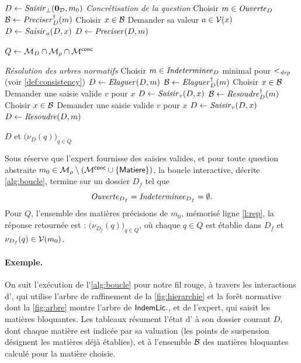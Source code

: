 \documentclass[review]{jflart}
\begin{document}
\begin{algorithm}[ht]
  \caption{Boucle interactive de résolution d'une question}
  \label{alg:boucle}
\begin{algorithmic}[1]
\small
\State $D \gets \mathit{Saisir}_\bot(\mathbf{0}_{\mathcal{D}},m_0)$
\Statex \textit{Concrétisation de la question}
  \State Choisir $m\in\mathit{Ouverte}_{D}$
  \State $\mathcal{B} \gets \mathit{Preciser}^\dagger_{D}(m)$
    \State Choisir $x\in \mathcal{B}$
    \State Demander sa valeur $a\in\mathcal{V}(x)$
    \State $D \gets \mathit{Saisir}_a(D,x)$
  \Else
    \State $D \gets \mathit{Preciser}(D,m)$
  \EndIf
\EndWhile

\State $Q \gets \mathcal{M}_D\cap\mathcal{M}_\rho\cap\mathcal{M}^{\mathsf{conc}}$ \label{l:rep}

\Statex \textit{Résolution des arbres normatifs}
  \State Choisir $m\in\mathit{Indeterminee}_D$ minimal pour $<_{\mathit{dep}}$ (voir \autoref{def:consistency})
  \State $D \gets \mathit{Elaguer}(D,m)$
  \State $\mathcal{B} \gets \mathit{Elaguer}^\dagger_D(m)$
    \State Choisir $x\in \mathcal{B}$
    \State Demander une saisie valide $v$ pour $x$
    \State $D \gets \mathit{Saisir}_v(D,x)$
  \Else
  \State $\mathcal{B} \gets \mathit{Resoudre}^\dagger_D(m)$
    \State Choisir $x\in \mathcal{B}$
    \State Demander une saisie valide $v$ pour $x$
    \State $D \gets \mathit{Saisir}_v(D,x)$
   \Else
    \State $D \gets \mathit{Resoudre}(D,m)$
   \EndIf
  \EndIf
\EndWhile

\State \Return $D$ et $\bigl(\nu_D(q)\bigr)_{q\in Q}$
\end{algorithmic}
\end{algorithm}

\begin{theo}\label{thm:boucle}
\label{cor:loop}
Sous réserve que l'expert fournisse des saisies valides, et pour toute question abstraite
$m_0\in\mathcal{M}_\rho\setminus(\mathcal{M}^{\mathsf{conc}}\cup\{\mathsf{Matiere}\})$, la boucle interactive, décrite \autoref{alg:boucle}, termine sur un dossier $D_f$
tel que
\[
\mathit{Ouverte}_{D_f}=\mathit{Indeterminee}_{D_f}=\emptyset.
\]
Pour $Q$, l'ensemble des matières précisions de $m_0$, mémorisé ligne \ref{l:rep}, la réponse retournée est :
\(\bigl(\nu_{D_f}(q)\bigr)_{q\in Q} \), où chaque $q\in Q$ est établie dans $D_f$ et $\nu_{D_f}(q)\in\mathcal{V}(m_0)$.
\end{theo}

\paragraph{Exemple.} On suit l'exécution de l'\autoref{alg:boucle} pour
notre fil rouge, à travers les interactions d'\ALex, qui utilise l'arbre de
raffinement de la \autoref{fig:hierarchie} et la forêt normative dont la
\autoref{fig:arbre} montre l'arbre de \(\mathsf{IndemLic.}\), et de l'expert, qui saisit
les matières bloquantes. Les tableaux résument l'état d'\ALex{} à son dossier
courant \(D\), dont chaque matière est indicée par sa valuation (les points
de suspension désignent les matières déjà établies), et à l'ensemble
\(\mathcal{B}\) des matières bloquantes calculé pour la matière choisie.
\end{document}

